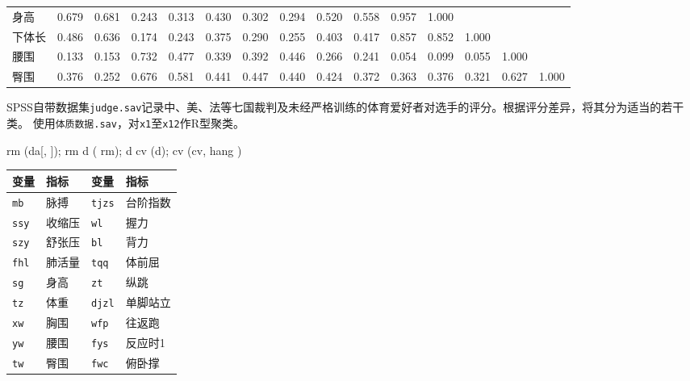\begin{landscape}
\begin{center}
\begin{minipage}{\linewidth}
\begin{tabular}{lrrrrrrrrrrrrrr}
身高 & 0.679 & 0.681 & 0.243 & 0.313 & 0.430 & 0.302 & 0.294 & 0.520 & 0.558 & 0.957 & 1.000 &  &  & \\
下体长 & 0.486 & 0.636 & 0.174 & 0.243 & 0.375 & 0.290 & 0.255 & 0.403 & 0.417 & 0.857 & 0.852 & 1.000 &  & \\
腰围 & 0.133 & 0.153 & 0.732 & 0.477 & 0.339 & 0.392 & 0.446 & 0.266 & 0.241 & 0.054 & 0.099 & 0.055 & 1.000 & \\
臀围 & 0.376 & 0.252 & 0.676 & 0.581 & 0.441 & 0.447 & 0.440 & 0.424 & 0.372 & 0.363 & 0.376 & 0.321 & 0.627 & 1.000\\
\bottomrule\end{tabular}
\end{minipage}\end{center}
\end{landscape}
SPSS自带数据集\texttt{judge.sav}记录中、美、法等七国裁判及未经严格训练的体育爱好者对选手的评分。根据评分差异，将其分为适当的若干类。
使用\texttt{体质数据.sav}，对\texttt{x1}至\texttt{x12}作R型聚类。
\begin{code}
rm \ROperator{<-} (da[, \ROperator{-}]); rm
d \ROperator{<-} ( \ROperator{-} rm); d        
cv \ROperator{<-} (d); cv
(cv, hang \ROperator{=} \ROperator{-})
\end{code}
\par\addvspace{5pt}\begin{center}\begin{minipage}{\linewidth}\centering
\small
{}
\begin{tabular}{llll}\toprule
{\bfseries 变量 }&{\bfseries  指标 }&{\bfseries  变量 }&{\bfseries  指标}\\\midrule
\texttt{mb} & 脉搏 & \texttt{tjzs} & 台阶指数\\
\texttt{ssy} & 收缩压 & \texttt{wl} & 握力\\
\texttt{szy} & 舒张压 & \texttt{bl} & 背力\\
\texttt{fhl} & 肺活量 & \texttt{tqq} & 体前屈\\
\texttt{sg} & 身高 & \texttt{zt} & 纵跳\\
\texttt{tz} & 体重 & \texttt{djzl} & 单脚站立\\
\texttt{xw} & 胸围 & \texttt{wfp} & 往返跑\\
\texttt{yw} & 腰围 & \texttt{fys} & 反应时1\\
\texttt{tw} & 臀围 & \texttt{fwc} & 俯卧撑\\
\bottomrule\end{tabular}
\end{minipage}\end{center}

